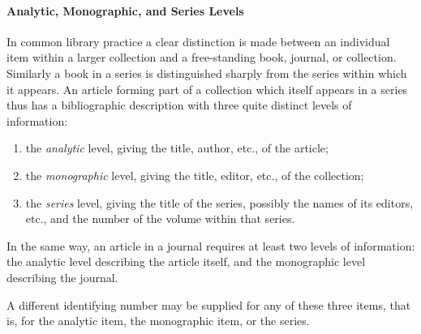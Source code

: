 \paragraph[{Analytic, Monographic, and Series Levels}]{Analytic, Monographic, and Series Levels}\label{COBICOL}\par
In common library practice a clear distinction is made between an individual item within a larger collection and a free-standing book, journal, or collection. Similarly a book in a series is distinguished sharply from the series within which it appears. An article forming part of a collection which itself appears in a series thus has a bibliographic description with three quite distinct levels of information: \begin{enumerate}
\item the \textit{analytic} level, giving the title, author, etc., of the article;
\item the \textit{monographic} level, giving the title, editor, etc., of the collection;
\item the \textit{series} level, giving the title of the series, possibly the names of its editors, etc., and the number of the volume within that series.
\end{enumerate} In the same way, an article in a journal requires at least two levels of information: the analytic level describing the article itself, and the monographic level describing the journal.\par
A different identifying number may be supplied for any of these three items, that is, for the analytic item, the monographic item, or the series. \par
